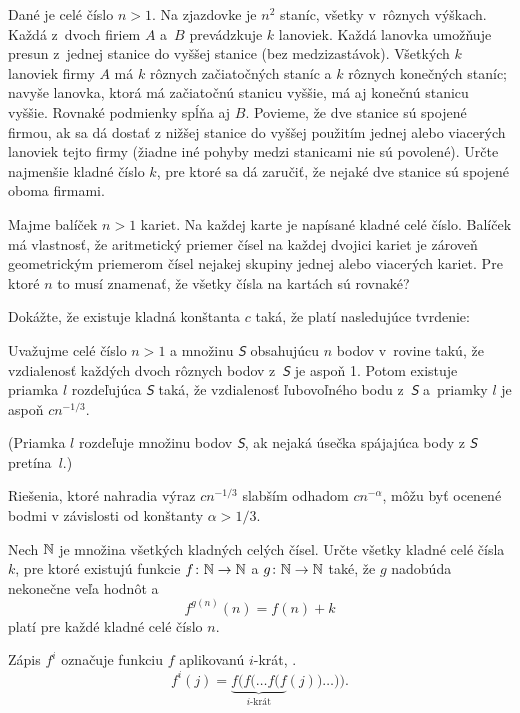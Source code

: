 {%
Dané je celé číslo $n > 1$. Na zjazdovke je $n^2$ staníc, všetky v~rôznych výškach. Každá
z~dvoch firiem $A$ a~$B$ prevádzkuje $k$ lanoviek. Každá lanovka umožňuje
presun z~jednej stanice do vyššej stanice (bez medzizastávok). Všetkých $k$ lanoviek firmy $A$ má $k$ rôznych
začiatočných staníc a $k$ rôznych konečných staníc; navyše lanovka, ktorá má začiatočnú stanicu
vyššie, má aj konečnú stanicu vyššie. Rovnaké podmienky spĺňa aj $B$. Povieme, že dve stanice sú
spojené firmou, ak sa dá dostať z nižšej stanice do vyššej použitím jednej alebo viacerých lanoviek
tejto firmy (žiadne iné pohyby medzi stanicami nie sú povolené).
Určte najmenšie kladné číslo $k$, pre ktoré sa dá zaručiť, že nejaké dve stanice sú spojené oboma
firmami.}

{%
Majme balíček $n > 1$ kariet. Na každej karte je napísané kladné celé číslo. Balíček má
vlastnosť, že aritmetický priemer čísel na každej dvojici kariet je zároveň geometrickým priemerom
čísel nejakej skupiny jednej alebo viacerých kariet.
Pre ktoré $n$ to musí znamenať, že všetky čísla na kartách sú rovnaké?}

{%
Dokážte, že existuje kladná konštanta $c$ taká, že platí nasledujúce tvrdenie:

{Uvažujme celé číslo $n > 1$ a množinu $\mathsfit S$ obsahujúcu $n$ bodov v~rovine takú, že vzdialenosť každých
dvoch rôznych bodov z~$\mathsfit S$ je aspoň 1. Potom existuje priamka $l$ rozdeľujúca $\mathsfit S$ taká, že vzdialenosť
ľubovoľného bodu z~$\mathsfit S$ a~priamky $l$ je aspoň $cn^{-1/3}$.}

(Priamka $l$ rozdeľuje množinu bodov $\mathsfit S$, ak nejaká úsečka spájajúca body z $\mathsfit S$ pretína~$l$.)

\poznamka
Riešenia, ktoré nahradia výraz $cn^{-1/3}$ slabším odhadom $cn^{-\alpha}$, môžu byť ocenené bodmi v závislosti od konštanty $\alpha > 1/3$.
}

{%
Nech $\Bbb N$ je množina všetkých kladných celých čísel. Určte všetky kladné celé čísla $k$, pre ktoré
existujú funkcie $f\colon\Bbb N\to\Bbb N$ a $g\colon\Bbb N\to\Bbb N$ také, že $g$ nadobúda nekonečne veľa hodnôt a
$$
f^{g(n)}(n) = f(n) + k
$$
platí pre každé kladné celé číslo $n$.

\poznamka
Zápis $f^i$ označuje funkciu $f$ aplikovanú $i$-krát, \tj. $$f^i(j) = \underbrace{f(f(\dots f(f}_{\text{$i$-krát}}(j))\dots)).$$}

